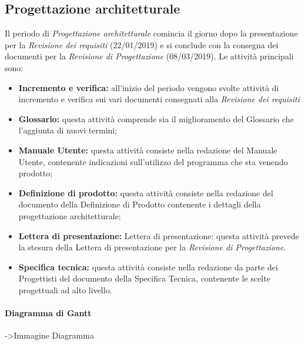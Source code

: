 \subsection{Progettazione architetturale}
Il periodo di \textit{Progettazione architetturale} comincia il giorno dopo la presentazione per la \textit{Revisione dei requisiti} (22/01/2019) e si conclude con la consegna dei documenti per la \textit{Revisione di Progettazione} (08/03/2019). Le attività principali sono:
\begin{itemize}
	\item{\textbf{Incremento e verifica:} all'inizio del periodo vengono svolte attività di incremento e verifica sui vari documenti consegnati alla \textit{Revisione dei requisiti}}
	\item{\textbf{Glossario:} questa attività comprende sia il miglioramento del Glossario che l’aggiunta di nuovi termini;}
	\item{\textbf{Manuale Utente:}  questa attività consiste nella redazione del Manuale Utente, contenente indicazioni sull’utilizzo del programma che sta venendo prodotto;}
	\item{\textbf{Definizione di prodotto:} questa attività consiste nella redazione del documento della Definizione di Prodotto contenente i dettagli della progettazione architetturale;}
	\item{\textbf{Lettera di presentazione:} Lettera di presentazione: questa attività prevede la stesura della Lettera di presentazione per la \textit{Revisione di Progettazione}.}
	\item{\textbf{Specifica tecnica:} questa attività consiste nella redazione da parte dei Progettisti del documento della Specifica Tecnica, contenente le scelte progettuali ad alto livello.}
\end{itemize}

\paragraph{Diagramma di Gantt}
->Immagine Diagramma

